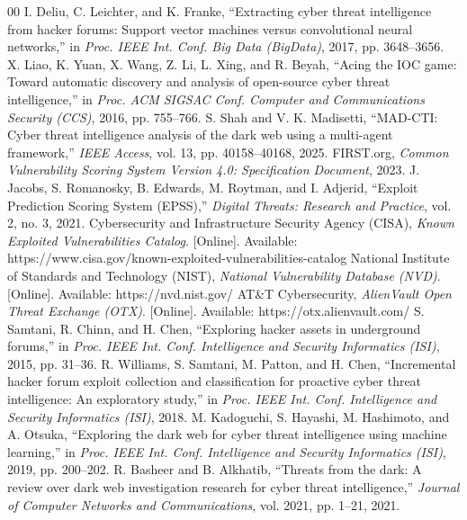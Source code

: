 \documentclass[conference]{IEEEtran}
\begin{document}
\begin{thebibliography}{00}
 I. Deliu, C. Leichter, and K. Franke, ``Extracting cyber threat intelligence from hacker forums: Support vector machines versus convolutional neural networks,'' in \textit{Proc. IEEE Int. Conf. Big Data (BigData)}, 2017, pp. 3648--3656.
 X. Liao, K. Yuan, X. Wang, Z. Li, L. Xing, and R. Beyah, ``Acing the IOC game: Toward automatic discovery and analysis of open-source cyber threat intelligence,'' in \textit{Proc. ACM SIGSAC Conf. Computer and Communications Security (CCS)}, 2016, pp. 755--766.
 S. Shah and V. K. Madisetti, ``MAD-CTI: Cyber threat intelligence analysis of the dark web using a multi-agent framework,'' \textit{IEEE Access}, vol. 13, pp. 40158--40168, 2025.
 FIRST.org, \textit{Common Vulnerability Scoring System Version 4.0: Specification Document}, 2023.
 J. Jacobs, S. Romanosky, B. Edwards, M. Roytman, and I. Adjerid, ``Exploit Prediction Scoring System (EPSS),'' \textit{Digital Threats: Research and Practice}, vol. 2, no. 3, 2021.
 Cybersecurity and Infrastructure Security Agency (CISA), \textit{Known Exploited Vulnerabilities Catalog}. [Online]. Available: https://www.cisa.gov/known-exploited-vulnerabilities-catalog
 National Institute of Standards and Technology (NIST), \textit{National Vulnerability Database (NVD)}. [Online]. Available: https://nvd.nist.gov/
 AT\&T Cybersecurity, \textit{AlienVault Open Threat Exchange (OTX)}. [Online]. Available: https://otx.alienvault.com/
 S. Samtani, R. Chinn, and H. Chen, ``Exploring hacker assets in underground forums,'' in \textit{Proc. IEEE Int. Conf. Intelligence and Security Informatics (ISI)}, 2015, pp. 31--36.
 R. Williams, S. Samtani, M. Patton, and H. Chen, ``Incremental hacker forum exploit collection and classification for proactive cyber threat intelligence: An exploratory study,'' in \textit{Proc. IEEE Int. Conf. Intelligence and Security Informatics (ISI)}, 2018.
 M. Kadoguchi, S. Hayashi, M. Hashimoto, and A. Otsuka, ``Exploring the dark web for cyber threat intelligence using machine learning,'' in \textit{Proc. IEEE Int. Conf. Intelligence and Security Informatics (ISI)}, 2019, pp. 200--202.
 R. Basheer and B. Alkhatib, ``Threats from the dark: A review over dark web investigation research for cyber threat intelligence,'' \textit{Journal of Computer Networks and Communications}, vol. 2021, pp. 1--21, 2021.

\end{thebibliography}
\end{document}
